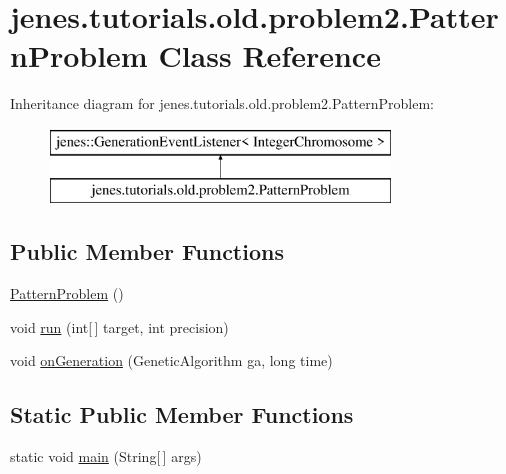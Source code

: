 \hypertarget{classjenes_1_1tutorials_1_1old_1_1problem2_1_1_pattern_problem}{\section{jenes.\-tutorials.\-old.\-problem2.\-Pattern\-Problem Class Reference}
\label{classjenes_1_1tutorials_1_1old_1_1problem2_1_1_pattern_problem}
}
Inheritance diagram for jenes.\-tutorials.\-old.\-problem2.\-Pattern\-Problem\-:\begin{figure}[H]
\begin{center}
\leavevmode
\includegraphics[height=2.000000cm]{classjenes_1_1tutorials_1_1old_1_1problem2_1_1_pattern_problem}
\end{center}
\end{figure}
\subsection*{Public Member Functions}
\begin{DoxyCompactItemize}
\item 
\hyperlink{classjenes_1_1tutorials_1_1old_1_1problem2_1_1_pattern_problem_adbf8a0345729346f9f03d8a7703f0d6d}{Pattern\-Problem} ()
\item 
void \hyperlink{classjenes_1_1tutorials_1_1old_1_1problem2_1_1_pattern_problem_aaeaef4b515a3fe02044c668a69f038a7}{run} (int\mbox{[}$\,$\mbox{]} target, int precision)
\item 
void \hyperlink{classjenes_1_1tutorials_1_1old_1_1problem2_1_1_pattern_problem_a1ed3cc6f1e19c0ffa6459e9c50aa9079}{on\-Generation} (Genetic\-Algorithm ga, long time)
\end{DoxyCompactItemize}
\subsection*{Static Public Member Functions}
\begin{DoxyCompactItemize}
\item 
static void \hyperlink{classjenes_1_1tutorials_1_1old_1_1problem2_1_1_pattern_problem_aab48fbec2976973bac23f7d26569453f}{main} (String\mbox{[}$\,$\mbox{]} args)
\end{DoxyCompactItemize}
